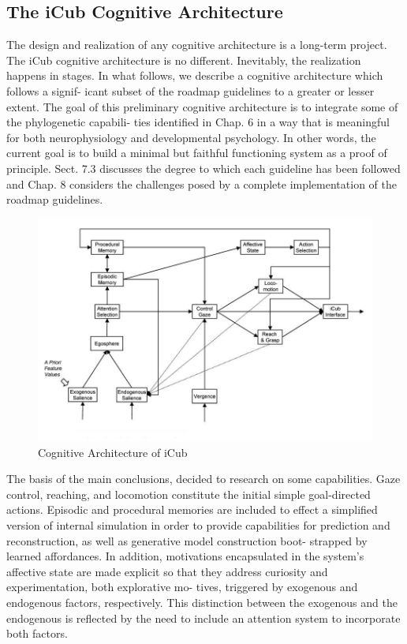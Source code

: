 \documentclass[a4paper, 11pt]{report}
\begin{document}
\subsection{The iCub Cognitive Architecture}
The design and realization of any cognitive architecture is a long-term 
project. The iCub cognitive architecture is no different. Inevitably, the 
realization happens in stages. In what follows, we describe a cognitive 
architecture which follows a signif- icant subset of the roadmap guidelines to 
a greater or lesser extent. The goal of this preliminary cognitive architecture 
is to integrate some of the phylogenetic capabili- ties identified in Chap. 6 
in a way that is meaningful for both neurophysiology and developmental 
psychology. In other words, the current goal is to build a minimal but faithful 
functioning system as a proof of principle. Sect. 7.3 discusses the degree to 
which each guideline has been followed and Chap. 8 considers the challenges 
posed by a complete implementation of the roadmap guidelines.
{\tiny}\begin{figure}[h!]
  \centering
  \includegraphics[width=1.0\linewidth]{cognitive_architecture}
  \caption{Cognitive Architecture of iCub}
  \label{fig:cognitive_architecture}
\end{figure}
The basis of the main conclusions, decided to research on some capabilities. 
Gaze control, reaching, and locomotion constitute the initial simple 
goal-directed actions. Episodic and procedural memories are 
included to effect a simplified version of internal simulation in order to 
provide capabilities for prediction and reconstruction, as well as generative 
model construction boot- strapped by learned affordances.
In addition, motivations encapsulated in the system’s affective state are made 
explicit so that they address curiosity and experimentation, both explorative 
mo- tives, triggered by exogenous and endogenous factors, respectively. This 
distinction between the exogenous and the endogenous is reflected by the need 
to include an attention system to incorporate both factors.
\newpage
\end{document}

